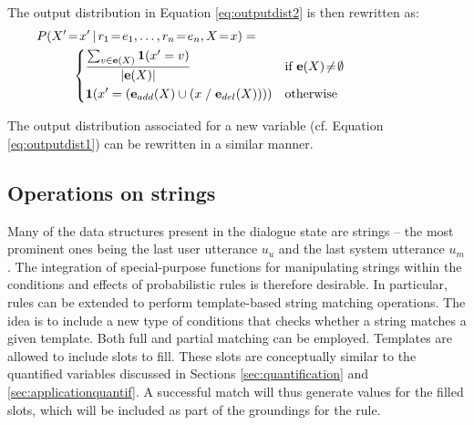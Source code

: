 The output distribution in Equation \eqref{eq:outputdist2} is then rewritten as:
\begin{align}
&P(X'\!=\!x' \, | \, r_1\!=\!e_1, \dots, r_n\!=\!e_n, X\!=\!x) = \hspace{5cm} \nonumber \\ & \; \; \; \; \; \; \; \; \; \;  \begin{dcases} 
\frac{\sum_{v \in {\mathbf{e}(X)}} \mathbf{1}(x' = v)} { |\mathbf{e}(X)| }  & \text{if } \mathbf{e}(X)\!\neq\!\emptyset \\
\mathbf{1}(x' = \left(\mathbf{e}_{add}(X) \cup \left(x \; / \; \mathbf{e}_{del}(X)\right)\right)) & \text{otherwise} \\
\end{dcases}\label{eq:outputdist4}
\end{align} 

The output distribution associated for a new variable (cf. Equation \eqref{eq:outputdist1}) can be rewritten in a similar manner.




\subsection{Operations on strings}

Many of the data structures present in the dialogue state are strings -- the most prominent ones being the last user utterance $u_u$ and the last system utterance $u_m$. The integration of special-purpose functions for manipulating strings within the conditions and effects of probabilistic rules is therefore desirable. In particular, rules can be extended to perform template-based string matching operations.  The idea is to include a new type of conditions that checks whether a string matches a given template.  Both full and partial matching can be employed. Templates are allowed to include slots to fill. These slots are conceptually similar to the quantified variables discussed in Sections \ref{sec:quantification} and \ref{sec:applicationquantif}. A successful match will thus generate values for the filled slots, which will be included as part of the groundings for the rule. 

